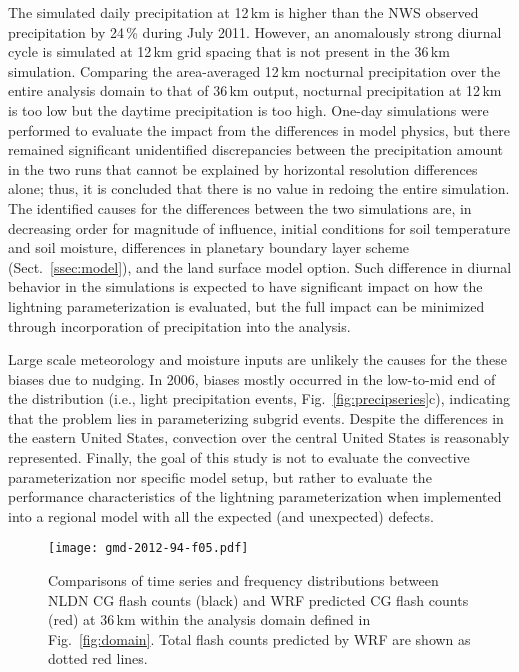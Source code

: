 The simulated daily precipitation at 12\,\unit{km} is higher than the NWS
observed precipitation by 24\,{\%} during July 2011. However, an anomalously
strong diurnal cycle is simulated at 12\,\unit{km} grid spacing that is not
present in the 36\,\unit{km} simulation. Comparing the area-averaged
12\,\unit{km} nocturnal precipitation over the entire analysis domain to that
of 36\,\unit{km} output, nocturnal precipitation at 12\,\unit{km} is too low
but the daytime precipitation is too high. One-day simulations were
performed to evaluate the impact from the differences in model physics, but
there remained significant unidentified discrepancies between the
precipitation amount in the two runs that cannot be explained by horizontal
resolution differences alone; thus, it is concluded that there is no value in
redoing the entire simulation. The identified causes for the differences
between the two simulations are, in decreasing order for magnitude of
influence, initial conditions for soil temperature and soil moisture,
differences in planetary boundary layer scheme (Sect.~\ref{ssec:model}), and
the land surface model option. Such difference in diurnal behavior in the
simulations is expected to have significant impact on how the lightning
parameterization is evaluated, but the full impact can be minimized through
incorporation of precipitation into the analysis.

Large scale meteorology and moisture inputs are unlikely the causes for the
these biases due to nudging. In 2006, biases mostly occurred in the
low-to-mid end of the distribution (i.e., light precipitation events,
Fig.~\ref{fig:precipseries}c), indicating that the problem lies in
parameterizing subgrid events. Despite the differences in the eastern United
States, convection over the central United States is reasonably represented.
Finally, the goal of this study is not to evaluate the convective
parameterization nor specific model setup, but rather to evaluate the
performance characteristics of the lightning parameterization when
implemented into a regional model with all the expected (and unexpected)
defects.


\begin{figure*}[t]
\texttt{[image: gmd-2012-94-f05.pdf]}
\caption{Comparisons of time series and frequency distributions between NLDN
CG flash counts (black) and WRF predicted CG flash counts (red) at
36\,\unit{km} within the analysis domain defined in Fig.~\ref{fig:domain}.
Total flash counts predicted by WRF are shown as dotted red lines.}
      \label{fig:cgseries}
\end{figure*}

